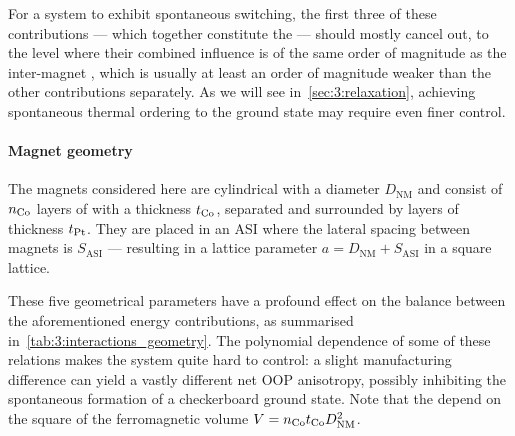 For a system to exhibit spontaneous switching, the first three of these contributions --- which together constitute the  --- should mostly cancel out, to the level where their combined influence is of the same order of magnitude as the inter-magnet , which is usually at least an order of magnitude weaker than the other contributions separately.
As we will see in~\cref{sec:3:relaxation}, achieving spontaneous thermal ordering to the ground state may require even finer control.

\paragraph{Magnet geometry}
\label{sec:3:OOP_geometry}

The magnets considered here are cylindrical with a diameter $D_\mathrm{NM}$ and consist of $n_{\ce{Co}}$ layers of  with a thickness $t_{\ce{Co}}$, separated and surrounded by  layers of thickness $t_{\ce{Pt}}$.
They are placed in an ASI where the lateral spacing between magnets is $S_\mathrm{ASI}$ --- resulting in a lattice parameter $a=D_\mathrm{NM}+S_\mathrm{ASI}$ in a square lattice. \par
These five geometrical parameters have a profound effect on the balance between the aforementioned energy contributions, as summarised in~\cref{tab:3:interactions_geometry}.
The polynomial dependence of some of these relations makes the system quite hard to control: a slight manufacturing difference can yield a vastly different net OOP anisotropy, possibly inhibiting the spontaneous formation of a checkerboard ground state.
Note that the  depend on the square of the ferromagnetic volume $V=n_{\ce{Co}} t_{\ce{Co}} D_\mathrm{NM}^2$.

